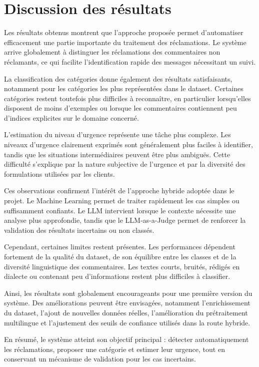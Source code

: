\documentclass[12pt,a4paper,oneside]{report}
\begin{document}
\vspace{-0.5cm}
\section{Discussion des résultats}
\vspace{-0.4cm}
Les résultats obtenus montrent que l’approche proposée permet d’automatiser efficacement une partie importante du traitement des réclamations. Le système arrive globalement à distinguer les réclamations des commentaires non réclamants, ce qui facilite l’identification rapide des messages nécessitant un suivi.

La classification des catégories donne également des résultats satisfaisants, notamment pour les catégories les plus représentées dans le dataset. Certaines catégories restent toutefois plus difficiles à reconnaître, en particulier lorsqu’elles disposent de moins d’exemples ou lorsque les commentaires contiennent peu d’indices explicites sur le domaine concerné.

L’estimation du niveau d’urgence représente une tâche plus complexe. Les niveaux d’urgence clairement exprimés sont généralement plus faciles à identifier, tandis que les situations intermédiaires peuvent être plus ambiguës. Cette difficulté s’explique par la nature subjective de l’urgence et par la diversité des formulations utilisées par les clients.

Ces observations confirment l’intérêt de l’approche hybride adoptée dans le projet. Le Machine Learning permet de traiter rapidement les cas simples ou suffisamment confiants. Le LLM intervient lorsque le contexte nécessite une analyse plus approfondie, tandis que le LLM-as-a-Judge permet de renforcer la validation des résultats incertains ou non classés.

Cependant, certaines limites restent présentes. Les performances dépendent fortement de la qualité du dataset, de son équilibre entre les classes et de la diversité linguistique des commentaires. Les textes courts, bruités, rédigés en dialecte ou contenant peu d’informations restent plus difficiles à classifier.

Ainsi, les résultats sont globalement encourageants pour une première version du système. Des améliorations peuvent être envisagées, notamment l’enrichissement du dataset, l’ajout de nouvelles données réelles, l’amélioration du prétraitement multilingue et l’ajustement des seuils de confiance utilisés dans la route hybride.

En résumé, le système atteint son objectif principal : détecter automatiquement les réclamations, proposer une catégorie et estimer leur urgence, tout en conservant un mécanisme de validation pour les cas incertains.
\end{document}
